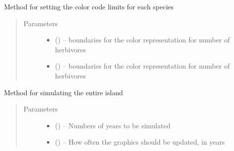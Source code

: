 \documentclass[a4paper,10pt,english]{sphinxmanual}
\begin{document}
\begin{fulllineitems}
\begin{fulllineitems}
\end{fulllineitems}


\begin{fulllineitems}
\label{\detokenize{simulation:biosim.simulation.BioSim.set_color_code_limits}}
Method for setting the color code limits for each species
\begin{quote}\begin{description}
\item[{Parameters}] \leavevmode\begin{itemize}
\item {} 
 () -- boundaries for the color representation for number of herbivores

\item {} 
 () -- boundaries for the color representation for number of herbivores

\end{itemize}

\end{description}\end{quote}

\end{fulllineitems}


\begin{fulllineitems}
\label{\detokenize{simulation:biosim.simulation.BioSim.simulate}}
Method for simulating the entire island
\begin{quote}\begin{description}
\item[{Parameters}] \leavevmode\begin{itemize}
\item {} 
 () -- Numbers of years to be simulated

\item {} 
 () -- How often the graphics should be updated, in years


\end{itemize}
\end{description}
\end{quote}
\end{fulllineitems}
\end{fulllineitems}
\end{document}
